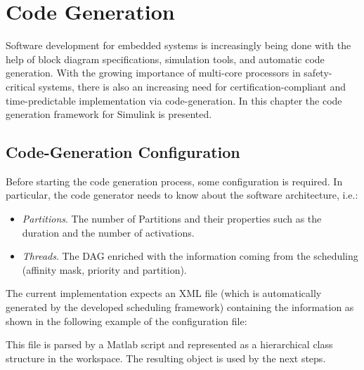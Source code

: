 
\chapter{Code Generation}

\ifpdf
    \graphicspath{{Chapters/Figs/Raster/}{Chapters/Figs/PDF/}{Chapters/Figs/}}
\else
    \graphicspath{{Chapters/Figs/Vector/}{Chapters/Figs/}}
\fi

Software development for embedded systems is increasingly being done with the help of block diagram specifications, simulation tools, and automatic code generation. With the growing importance of multi-core processors in safety-critical systems, there is also an increasing need for certification-compliant and time-predictable implementation via code-generation. In this chapter the code generation framework for Simulink is presented.

\section{Code-Generation Configuration}\label{sec:modelAdapt}
Before starting the code generation process, some configuration is required. In particular, the code generator needs to know about the software architecture, i.e.:
\begin{itemize}
\item \emph{Partitions}. The number of Partitions and their properties such as the duration and the number of activations.
\item \emph{Threads}. The DAG enriched with the information coming from the scheduling (affinity mask, priority and partition).
\end{itemize}
The current implementation expects an XML file (which is automatically generated by the developed scheduling framework) containing the  information as shown in the following example of the configuration file:

This file is parsed by a Matlab script and represented as a hierarchical class structure in the workspace. The resulting object is used by the next steps. 

